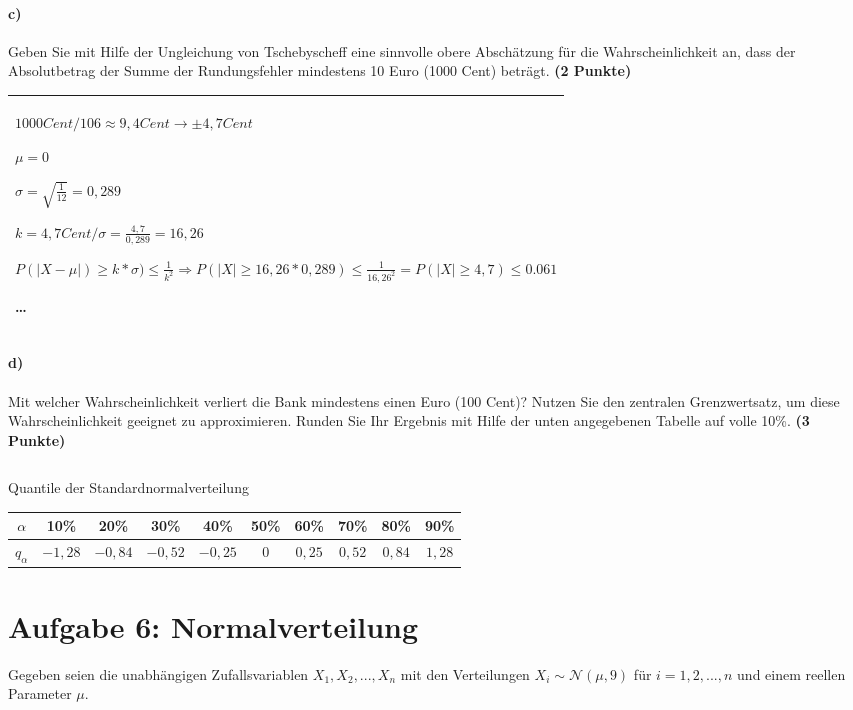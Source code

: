 \documentclass[10pt, a4paper]{article}
\begin{document}
\paragraph{c)} Geben Sie mit Hilfe der Ungleichung von Tschebyscheff eine sinnvolle obere Abschätzung für die Wahrscheinlichkeit an, dass der Absolutbetrag der Summe der Rundungsfehler mindestens 10 Euro (1000 Cent) beträgt. \textbf{(2 Punkte)}\\
\begin{tabular}{| p{17cm} |}
    \hline
    $1000 Cent / 106 \approx 9,4 Cent \rightarrow \pm 4,7 Cent$
    
    $\mu= 0$
    
    $\sigma= \sqrt{\frac{1}{12}} = 0,289$

    $k = 4,7 Cent / \sigma = \frac{4,7}{0,289} = 16,26$
    
    $P(|X-\mu|)\geq k*\sigma) \leq \frac{1}{k^2} \Rightarrow P(|X|\geq 16,26*0,289)\leq \frac{1}{16,26^2} = P(|X|\geq 4,7) \leq 0.061$

    \dots
    \\\hline
\end{tabular}

\paragraph{d)} Mit welcher Wahrscheinlichkeit verliert die Bank mindestens einen Euro (100 Cent)? Nutzen Sie den zentralen Grenzwertsatz, um diese Wahrscheinlichkeit geeignet zu approximieren. Runden Sie Ihr Ergebnis mit Hilfe der unten angegebenen Tabelle auf volle 10\%. \textbf{(3 Punkte)}\\
\begin{tabular}{| p{17cm} |}
    \hline
    \\\hline
\end{tabular}

Quantile der Standardnormalverteilung\\
\begin{center}
\begin{tabular}{c | c | c | c | c | c | c | c | c | c}
    $\alpha$     & 10\%    & 20\%    & 30\%    & 40\%    & 50\% & 60\%   & 70\%   & 80\%   & 90\%   \\\hline
    $q_{\alpha}$ & $-1,28$ & $-0,84$ & $-0,52$ & $-0,25$ & $0$  & $0,25$ & $0,52$ & $0,84$ & $1,28$
\end{tabular}
\end{center}

\section{Aufgabe 6: Normalverteilung}
Gegeben seien die unabhängigen Zufallsvariablen $X_1,X_2,...,X_n$ mit den Verteilungen $X_i \sim \mathcal{N}(\mu,9)$ für $i= 1,2,...,n$ und einem reellen Parameter $\mu$.
\end{document}
